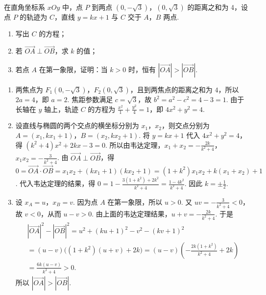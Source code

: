 \begin{problem}
在直角坐标系 \(xOy\) 中，点 \(P\) 到两点 \((0, -\sqrt{3})\)，\((0, \sqrt{3})\) 的距离之和为 4，设点 \(P\) 的轨迹为 \(C\)，直线 \(y = kx + 1\) 与 \(C\) 交于 \(A\)，\(B\) 两点.

\begin{enumerate}
\item 写出 \(C\) 的方程；
\item 若 \(\overrightarrow{OA} \perp \overrightarrow{OB}\)，求 \(k\) 的值；
\item 若点 \(A\) 在第一象限，证明：当 \(k > 0\) 时，恒有 \(\left|\overrightarrow{OA}\right| > \left|\overrightarrow{OB}\right|\).
\end{enumerate}
\end{problem}

\begin{solution}
\begin{enumerate}
\item 两焦点为 \(F_1(0,-\sqrt{3})\)，\(F_2(0,\sqrt{3})\)，且到两焦点的距离之和为 \(4\)，所以 \(2a=4\)，即 \(a=2\). 焦距参数满足 \(c=\sqrt{3}\)，故 \(b^2=a^2-c^2=4-3=1\). 由于长轴在 \(y\) 轴上，轨迹 \(C\) 的方程为 \(\frac{x^2}{1}+\frac{y^2}{4}=1\)，即 \(4x^2+y^2=4\).

\item 设直线与椭圆的两个交点的横坐标分别为 \(x_1\)，\(x_2\)，则交点分别为 \(A=(x_1,kx_1+1)\)，\(B=(x_2,kx_2+1)\). 将 \(y=kx+1\) 代入 \(4x^2+y^2=4\)，得 \((k^2+4)x^2+2kx-3=0\). 所以由韦达定理，\(x_1+x_2=-\frac{2k}{k^2+4}\)，\(x_1x_2=-\frac{3}{k^2+4}\). 由 \(\overrightarrow{OA}\perp\overrightarrow{OB}\)，得 \(0=\overrightarrow{OA}\cdot\overrightarrow{OB}=x_1x_2+(kx_1+1)(kx_2+1)=(1+k^2)x_1x_2+k(x_1+x_2)+1\). 代入韦达定理的结果，得 \(0=1-\frac{3(1+k^2)+2k^2}{k^2+4}=\frac{1-4k^2}{k^2+4}\). 因此 \(k=\pm\frac{1}{2}\).

\item 设 \(x_A=u\)，\(x_B=v\). 因为点 \(A\) 在第一象限，所以 \(u>0\). 又 \(uv=-\frac{3}{k^2+4}<0\)，故 \(v<0\)，从而 \(u-v>0\). 由上面的韦达定理结果，\(u+v=-\frac{2k}{k^2+4}\). 于是
\[
\begin{gathered}
\left|\overrightarrow{OA}\right|^2-\left|\overrightarrow{OB}\right|^2=u^2+(ku+1)^2-v^2-(kv+1)^2\\
=(u-v)\bigl((1+k^2)(u+v)+2k\bigr)=(u-v)\left(-\frac{2k(1+k^2)}{k^2+4}+2k\right)\\
=\frac{6k(u-v)}{k^2+4}>0.
\end{gathered}
\]
所以 \(\left|\overrightarrow{OA}\right|>\left|\overrightarrow{OB}\right|\).
\end{enumerate}
\end{solution}

